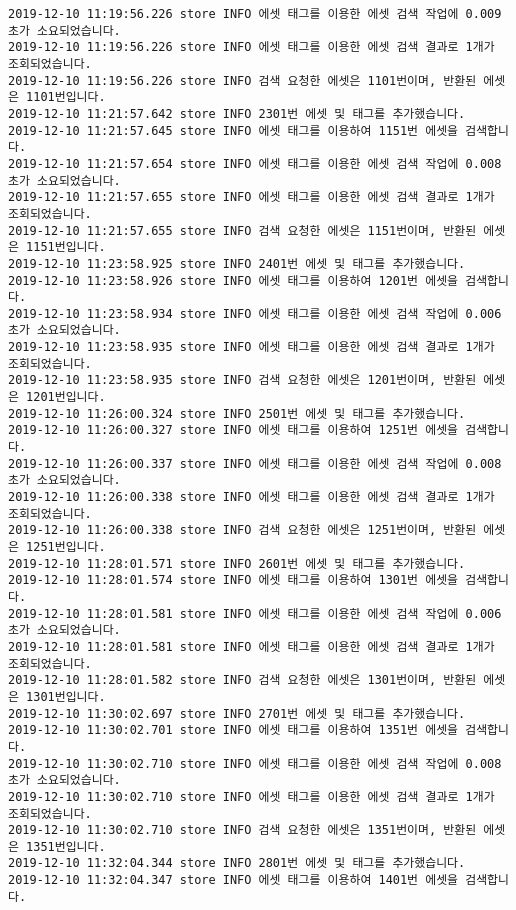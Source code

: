 \begin{Verbatim}[fontsize=\tiny, breaklines=true, breakanywhere=true]
2019-12-10 11:19:56.226 store INFO 에셋 태그를 이용한 에셋 검색 작업에 0.009초가 소요되었습니다.
2019-12-10 11:19:56.226 store INFO 에셋 태그를 이용한 에셋 검색 결과로 1개가 조회되었습니다.
2019-12-10 11:19:56.226 store INFO 검색 요청한 에셋은 1101번이며, 반환된 에셋은 1101번입니다.
2019-12-10 11:21:57.642 store INFO 2301번 에셋 및 태그를 추가했습니다.
2019-12-10 11:21:57.645 store INFO 에셋 태그를 이용하여 1151번 에셋을 검색합니다.
2019-12-10 11:21:57.654 store INFO 에셋 태그를 이용한 에셋 검색 작업에 0.008초가 소요되었습니다.
2019-12-10 11:21:57.655 store INFO 에셋 태그를 이용한 에셋 검색 결과로 1개가 조회되었습니다.
2019-12-10 11:21:57.655 store INFO 검색 요청한 에셋은 1151번이며, 반환된 에셋은 1151번입니다.
2019-12-10 11:23:58.925 store INFO 2401번 에셋 및 태그를 추가했습니다.
2019-12-10 11:23:58.926 store INFO 에셋 태그를 이용하여 1201번 에셋을 검색합니다.
2019-12-10 11:23:58.934 store INFO 에셋 태그를 이용한 에셋 검색 작업에 0.006초가 소요되었습니다.
2019-12-10 11:23:58.935 store INFO 에셋 태그를 이용한 에셋 검색 결과로 1개가 조회되었습니다.
2019-12-10 11:23:58.935 store INFO 검색 요청한 에셋은 1201번이며, 반환된 에셋은 1201번입니다.
2019-12-10 11:26:00.324 store INFO 2501번 에셋 및 태그를 추가했습니다.
2019-12-10 11:26:00.327 store INFO 에셋 태그를 이용하여 1251번 에셋을 검색합니다.
2019-12-10 11:26:00.337 store INFO 에셋 태그를 이용한 에셋 검색 작업에 0.008초가 소요되었습니다.
2019-12-10 11:26:00.338 store INFO 에셋 태그를 이용한 에셋 검색 결과로 1개가 조회되었습니다.
2019-12-10 11:26:00.338 store INFO 검색 요청한 에셋은 1251번이며, 반환된 에셋은 1251번입니다.
2019-12-10 11:28:01.571 store INFO 2601번 에셋 및 태그를 추가했습니다.
2019-12-10 11:28:01.574 store INFO 에셋 태그를 이용하여 1301번 에셋을 검색합니다.
2019-12-10 11:28:01.581 store INFO 에셋 태그를 이용한 에셋 검색 작업에 0.006초가 소요되었습니다.
2019-12-10 11:28:01.581 store INFO 에셋 태그를 이용한 에셋 검색 결과로 1개가 조회되었습니다.
2019-12-10 11:28:01.582 store INFO 검색 요청한 에셋은 1301번이며, 반환된 에셋은 1301번입니다.
2019-12-10 11:30:02.697 store INFO 2701번 에셋 및 태그를 추가했습니다.
2019-12-10 11:30:02.701 store INFO 에셋 태그를 이용하여 1351번 에셋을 검색합니다.
2019-12-10 11:30:02.710 store INFO 에셋 태그를 이용한 에셋 검색 작업에 0.008초가 소요되었습니다.
2019-12-10 11:30:02.710 store INFO 에셋 태그를 이용한 에셋 검색 결과로 1개가 조회되었습니다.
2019-12-10 11:30:02.710 store INFO 검색 요청한 에셋은 1351번이며, 반환된 에셋은 1351번입니다.
2019-12-10 11:32:04.344 store INFO 2801번 에셋 및 태그를 추가했습니다.
2019-12-10 11:32:04.347 store INFO 에셋 태그를 이용하여 1401번 에셋을 검색합니다.

\end{Verbatim}

